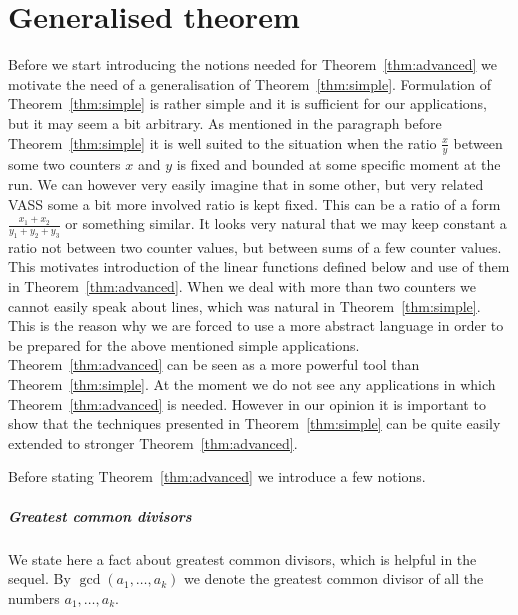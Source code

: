 \section{Generalised theorem}\label{sec:advanced}
Before we start introducing the notions needed for Theorem~\ref{thm:advanced} we motivate
the need of a generalisation of Theorem~\ref{thm:simple}. 
Formulation of Theorem~\ref{thm:simple} is rather simple and it is sufficient for our applications, but it may seem a bit arbitrary.
As mentioned in the paragraph before Theorem~\ref{thm:simple} it is well suited to the situation
when the ratio $\frac{x}{y}$ between some two counters $x$ and $y$ is fixed and bounded at some specific moment at the run.
We can however very easily imagine that in some other, but very related VASS 
some a bit more involved ratio is kept fixed. This can be a ratio of a form
$\frac{x_1 + x_2}{y_1 + y_2 + y_3}$ or something similar. It looks very natural that we may
keep constant a ratio not between two counter values, but between sums of a few counter values.
This motivates introduction of the linear functions defined below and use of them in Theorem~\ref{thm:advanced}.
When we deal with more than two counters we cannot easily speak about lines, which was natural in Theorem~\ref{thm:simple}.
This is the reason why we are forced to use a more abstract language in order to be prepared
for the above mentioned simple applications. Theorem~\ref{thm:advanced} can be seen
as a more powerful tool than Theorem~\ref{thm:simple}. At the moment we do not see
any applications in which Theorem~\ref{thm:advanced} is needed. However in our opinion
it is important to show that the techniques presented in Theorem~\ref{thm:simple} can be quite
easily extended to stronger Theorem~\ref{thm:advanced}.

Before stating Theorem~\ref{thm:advanced} we introduce a few notions.

\subparagraph*{Greatest common divisors}
We state here a fact about greatest common divisors, which is helpful in the sequel.
By $\gcd(a_1, \ldots, a_k)$ we denote the greatest common divisor of all the numbers $a_1, \ldots, a_k$.

